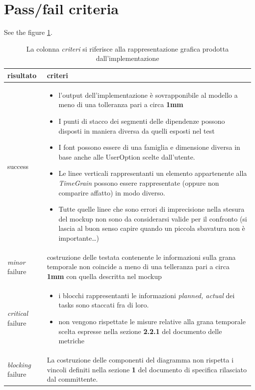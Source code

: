 \section{Pass/fail criteria}
See the figure \ref{table:passfailCriteriaGanttGeneration}.
\begin{table}[h!]
  \begin{center}
    \begin{tabular}{| l | p{100mm} |}
    \hline
    \textbf{risultato} & \textbf{criteri} \\
	\hline    
	success & 
    \begin{itemize}
  \item l'output dell'implementazione \`e sovrapponibile al modello a meno 
di una tolleranza pari a circa \textbf{1mm}
\item I punti di stacco dei segmenti
delle dipendenze possono disposti in maniera diversa da quelli esposti nel test
\item I font possono essere di una famiglia e dimensione diversa in base anche alle
UserOption scelte dall'utente.
\item Le linee verticali rappresentanti un elemento appartenente alla
\emph{TimeGrain} possono essere rappresentate (oppure non comparire affatto) in modo diverso.
\item Tutte quelle linee che sono errori di imprecisione nella stesura del mockup non
sono da considerarsi valide per il confronto (si lascia al buon senso capire
quando un piccola sbavatura non \`e importante\ldots)      
\end{itemize}
\\
    \hline
    \emph{minor} failure & costruzione delle testata contenente le informazioni
    sulla grana temporale non coincide a meno di una telleranza pari a circa 
    \textbf{1mm} con quella descritta nel mockup
    \\
    \hline
    \emph{critical} failure & 
    \begin{itemize}
    \item i blocchi rappresentanti le informazioni \emph{planned, actual} dei
    tasks sono staccati fra di loro. 
    \item non vengono rispettate le misure relative alla grana temporale
    scelta espresse nella sezione \textbf{2.2.1} del documento delle metriche 
    \end{itemize}\\
    \hline
    \emph{blocking} failure & La costruzione delle componenti del diagramma
    non rispetta i vincoli definiti nella sezione \textbf{1} del documento di 
   specifica rilasciato dal committente. \\
    \hline
    \end{tabular}
  \end{center}
	\caption{La colonna \emph{criteri} si riferisce alla rappresentazione grafica
	prodotta dall'implementazione}
	\label{table:passfailCriteriaGanttGeneration}
\end{table}